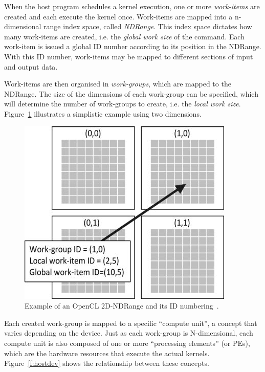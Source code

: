 When the host program schedules a kernel execution, one or more \textit{\glspl{work-item}} are created and each execute the kernel once. Work-items are mapped into a n-dimensional range index space, called \textit{\gls{NDRange}}. This index space dictates how many work-items are created, i.e. the \textit{\gls{global work size}} of the command. Each work-item is issued a global ID number according to its position in the NDRange. With this ID number, work-items may be mapped to different sections of input and output data. 

Work-items are then organised in \textit{\glspl{work-group}}, which are mapped to the NDRange. The size of the dimensions of each work-group can be specified, which will determine the number of work-groups to create, i.e. the \textit{\gls{local work size}}. Figure~\ref{f:work2d} illustrates a simplistic example using two dimensions.

\begin{figure}[!h]
\begin{center}
\centerline{\includegraphics{img/work2d}}
\caption[Example of an OpenCL 2D-NDRange and its ID numbering.]{Example of an OpenCL 2D-NDRange and its ID numbering~\cite{tsuchiyama2010opencl}.}
\label{f:work2d}
\end{center}
\end{figure}

Each created work-group is mapped to a specific ``compute unit'', a concept that varies depending on the device. Just as each work-group is N-dimensional, each compute unit is also composed of one or more ``\glspl{processing element}'' (or PEs), which are the hardware resources that execute the actual kernels. Figure~\ref{f:hostdev} shows the relationship between these concepts.

